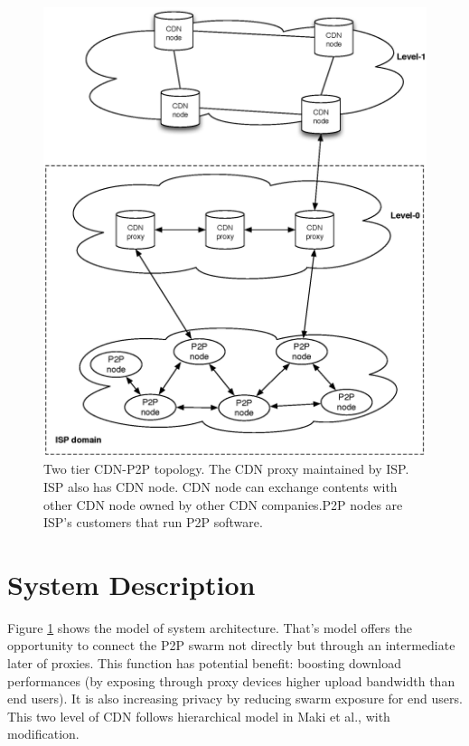 \documentclass[paper]{ieice}
\begin{document}
\begin{figure}[hb]
\begin{center}
\includegraphics[scale=0.35]{graphs/two-tier-cdn-topology.eps}
\end{center}
\caption{Two tier CDN-P2P topology.
The CDN proxy maintained by ISP. ISP also has CDN node. CDN node can exchange contents with other CDN node owned by other CDN companies.P2P nodes are ISP's customers that run P2P software.}
\label{fig:twotier}
\vspace{-2mm}
\end{figure} 


 
\section{System Description}\label{description}

Figure \ref{fig:twotier} shows the model of system architecture.
That's model offers the opportunity to connect the P2P swarm not directly but through an intermediate later of proxies.
This function has potential benefit: boosting download performances (by exposing through proxy devices higher upload bandwidth than end users). 
It is also increasing privacy by reducing swarm exposure for end users.
This two level of CDN follows hierarchical model in Maki et al.,\cite{NaoyaMAKI2012} with modification.
\end{document}
